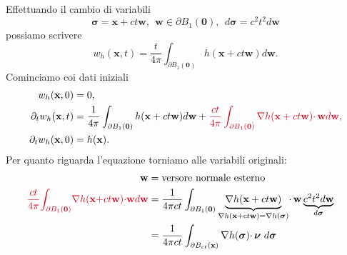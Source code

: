 \documentclass[10pt,a4paper,twoside,openright]{book}
\newcommand{\x}{\mathbf{x}}
\newcommand{\zer}{\mathbf{0}}
\begin{document}
\begin{dimostrazione}
	Effettuando il cambio di variabili
	\begin{equation*}
		\bm{\sigma } =\x +ct\mathbf{w} ,\ \ \mathbf{w} \in \partial B_{1}(\zer) ,\ \ d\bm{\sigma } =c^{2} t^{2} d\mathbf{w}
	\end{equation*}
	possiamo scrivere
	\begin{equation*}
		w_{h}(\x ,t) =\frac{t}{4\pi }\int _{\partial B_{1}(\zer)} h(\x +ct\mathbf{w}) d\mathbf{w} .
	\end{equation*}
	Cominciamo coi dati iniziali
	\begin{align*}
		w_{h}(\x ,0)               & =0,                                                                                                                                                                                                                                              \\
		\partial _{t} w_{h}(\x ,t) & =\frac{1}{4\pi }\int _{\partial B_{1}(\zer)} h(\x +ct\mathbf{w}) d\mathbf{w} +\textcolor[rgb]{0.82,0.01,0.11}{\frac{ct}{4\pi }\int _{\partial B_{1}(\zer)}\nabla h(\x +ct\mathbf{w})\cdotp \mathbf{w} d\mathbf{w} ,} \\
		\partial _{t} w_{h}(\x ,0) & =h(\x) .                                                                                                                                                                                                                                 
	\end{align*}
	Per quanto riguarda l'equazione torniamo alle variabili originali:
	\begin{align*}
		\mathbf{w} & =\text{versore normale esterno} & \\
		\textcolor[rgb]{0.82,0.01,0.11}{\frac{ct}{4\pi }}\textcolor[rgb]{0.82,0.01,0.11}{\int _{\partial B_{1}(\zer)}}\textcolor[rgb]{0.82,0.01,0.11}{\nabla h}\textcolor[rgb]{0.82,0.01,0.11}{(}\textcolor[rgb]{0.82,0.01,0.11}{\x}\textcolor[rgb]{0.82,0.01,0.11}{+ct}\textcolor[rgb]{0.82,0.01,0.11}{\mathbf{w}}\textcolor[rgb]{0.82,0.01,0.11}{)}\textcolor[rgb]{0.82,0.01,0.11}{\cdotp }\textcolor[rgb]{0.82,0.01,0.11}{\mathbf{w}}\textcolor[rgb]{0.82,0.01,0.11}{d}\textcolor[rgb]{0.82,0.01,0.11}{\mathbf{w}} & =\frac{1}{4\pi ct}\int _{\partial B_{1}(\zer)}\underbrace{\nabla h(\x +ct\mathbf{w})}_{\nabla h(\x +ct\mathbf{w}) =\nabla h(\bm{\sigma})} \cdotp \mathbf{w}\underbrace{c^{2} t^{2} d\mathbf{w}}_{d\bm{\sigma}} & \\
	 	& =\frac{1}{4\pi ct}\int _{\partial B_{ct}(\x)} \nabla h(\bm{\sigma}) \cdotp \bm{\nu} \ d\bm{\sigma} & \\

\end{align*}
\end{dimostrazione}
\end{document}
